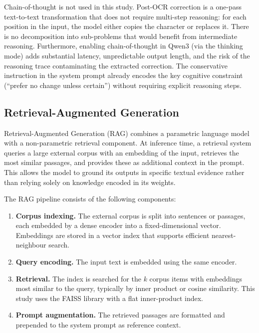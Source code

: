 Chain-of-thought is not used in this study.
Post-OCR correction is a one-pass text-to-text transformation that does not
require multi-step reasoning: for each position in the input, the model either
copies the character or replaces it.
There is no decomposition into sub-problems that would benefit from intermediate
reasoning.
Furthermore, enabling chain-of-thought in Qwen3 (via the thinking mode) adds
substantial latency, unpredictable output length, and the risk of the reasoning
trace contaminating the extracted correction.
The conservative instruction in the system prompt already encodes the key
cognitive constraint (``prefer no change unless certain'') without requiring
explicit reasoning steps.

\subsection{Retrieval-Augmented Generation}
\label{subsec:rag}

Retrieval-Augmented Generation (RAG) \cite{lewis2020retrieval} combines a
parametric language model with a non-parametric retrieval component.
At inference time, a retrieval system queries a large external corpus with an
embedding of the input, retrieves the most similar passages, and provides these
as additional context in the prompt.
This allows the model to ground its outputs in specific textual evidence rather
than relying solely on knowledge encoded in its weights.

The RAG pipeline consists of the following components:

\begin{enumerate}
  \item \textbf{Corpus indexing.}
        The external corpus is split into sentences or passages, each embedded
        by a dense encoder into a fixed-dimensional vector.
        Embeddings are stored in a vector index that supports efficient
        nearest-neighbour search.

  \item \textbf{Query encoding.}
        The input text is embedded using the same encoder.

  \item \textbf{Retrieval.}
        The index is searched for the $k$ corpus items with embeddings most
        similar to the query, typically by inner product or cosine similarity.
        This study uses the FAISS \cite{johnson2019faiss} library with a flat
        inner-product index.

  \item \textbf{Prompt augmentation.}
        The retrieved passages are formatted and prepended to the system prompt
        as reference context.
\end{enumerate}

